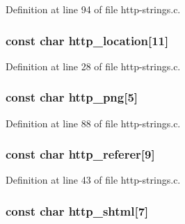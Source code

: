Definition at line 94 of file http-\/strings.c.

\hypertarget{http-strings_8h_ae44cdccc053a527b644269f796af7e62}{
\subsubsection[{http\_\-location}]{\setlength{\rightskip}{0pt plus 5cm}const char {\bf http\_\-location}\mbox{[}11\mbox{]}}}
\label{http-strings_8h_ae44cdccc053a527b644269f796af7e62}


Definition at line 28 of file http-\/strings.c.

\hypertarget{http-strings_8h_a2d5a64e8568607133bdf64f53ab719e6}{
\subsubsection[{http\_\-png}]{\setlength{\rightskip}{0pt plus 5cm}const char {\bf http\_\-png}\mbox{[}5\mbox{]}}}
\label{http-strings_8h_a2d5a64e8568607133bdf64f53ab719e6}


Definition at line 88 of file http-\/strings.c.

\hypertarget{http-strings_8h_a52402a0f5f1a643cf91cec0333241654}{
\subsubsection[{http\_\-referer}]{\setlength{\rightskip}{0pt plus 5cm}const char {\bf http\_\-referer}\mbox{[}9\mbox{]}}}
\label{http-strings_8h_a52402a0f5f1a643cf91cec0333241654}


Definition at line 43 of file http-\/strings.c.

\hypertarget{http-strings_8h_a52dc3e4726e77d123639f5a2ef5d82d8}{
\subsubsection[{http\_\-shtml}]{\setlength{\rightskip}{0pt plus 5cm}const char {\bf http\_\-shtml}\mbox{[}7\mbox{]}}}
\label{http-strings_8h_a52dc3e4726e77d123639f5a2ef5d82d8}


